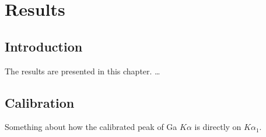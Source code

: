 \chapter{Results}


\section{Introduction}
\label{sec:results:intro}
The results are presented in this chapter. \dots




\section{Calibration}
\label{sec:results:calibration}

Something about how the calibrated peak of Ga $K\alpha$ is directly on $K\alpha_1$.
